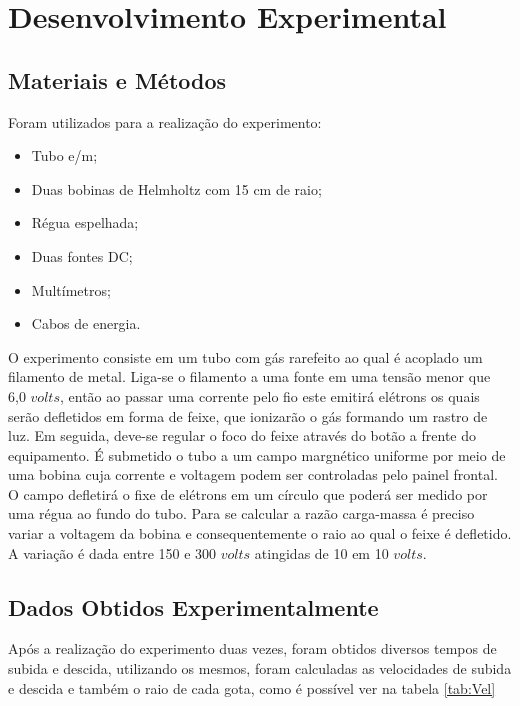 \section{Desenvolvimento Experimental}
\subsection{Materiais e Métodos}
Foram utilizados para a realização do experimento:
\begin{itemize}
	\item Tubo e/m;
	\item Duas bobinas de Helmholtz com 15 cm de raio;
	\item Régua espelhada;
	\item Duas fontes DC;
	\item Multímetros;
	\item Cabos de energia.
\end{itemize}

O experimento consiste em um tubo com gás rarefeito  ao qual é acoplado um filamento de metal. Liga-se o filamento a uma fonte em uma tensão menor que 6,0 $volts$, então ao passar uma corrente pelo fio este emitirá elétrons os quais serão defletidos em forma de feixe, que ionizarão o gás formando um rastro de luz. Em seguida, deve-se regular o foco do feixe através do botão a frente do equipamento. É submetido o tubo a um campo margnético uniforme por meio de uma bobina cuja corrente e voltagem podem ser controladas pelo painel frontal. O campo defletirá o fixe de elétrons em um círculo que poderá ser medido por uma régua ao fundo do tubo. Para se calcular a razão carga-massa é preciso variar a voltagem da bobina e consequentemente o raio ao qual o feixe é defletido. A variação é dada entre 150 e 300 $volts$ atingidas de 10 em 10 $volts$.

\subsection{Dados Obtidos Experimentalmente}
Após a realização do experimento duas vezes, foram obtidos diversos tempos de subida e descida, utilizando os mesmos, foram calculadas as velocidades de subida e descida e também o raio de cada gota, como é possível ver na tabela \ref{tab:Vel}

